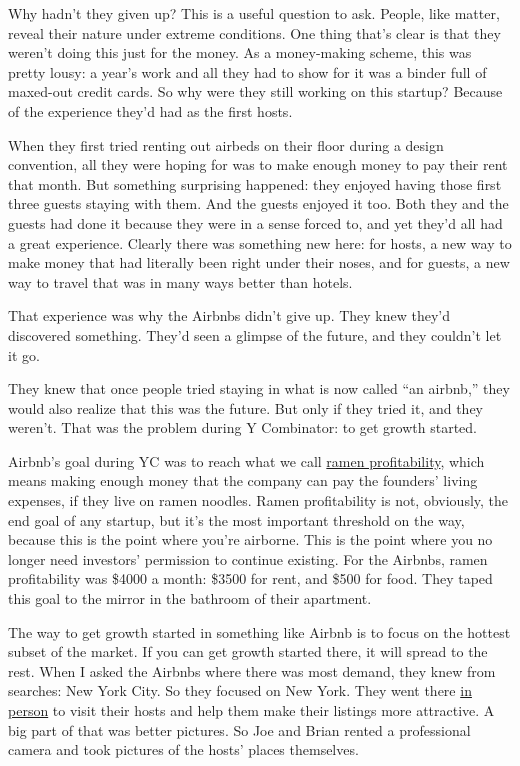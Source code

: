 Why hadn't they given up? This is a useful question to ask. People, like
matter, reveal their nature under extreme conditions. One thing that's
clear is that they weren't doing this just for the money. As a
money-making scheme, this was pretty lousy: a year's work and all they
had to show for it was a binder full of maxed-out credit cards. So why
were they still working on this startup? Because of the experience
they'd had as the first hosts.

When they first tried renting out airbeds on their floor during a design
convention, all they were hoping for was to make enough money to pay
their rent that month. But something surprising happened: they enjoyed
having those first three guests staying with them. And the guests
enjoyed it too. Both they and the guests had done it because they were
in a sense forced to, and yet they'd all had a great experience. Clearly
there was something new here: for hosts, a new way to make money that
had literally been right under their noses, and for guests, a new way to
travel that was in many ways better than hotels.

That experience was why the Airbnbs didn't give up. They knew they'd
discovered something. They'd seen a glimpse of the future, and they
couldn't let it go.

They knew that once people tried staying in what is now called ``an
airbnb,'' they would also realize that this was the future. But only if
they tried it, and they weren't. That was the problem during Y
Combinator: to get growth started.

Airbnb's goal during YC was to reach what we call
\href{http://paulgraham.com/ramenprofitable.html}{ramen profitability},
which means making enough money that the company can pay the founders'
living expenses, if they live on ramen noodles. Ramen profitability is
not, obviously, the end goal of any startup, but it's the most important
threshold on the way, because this is the point where you're airborne.
This is the point where you no longer need investors' permission to
continue existing. For the Airbnbs, ramen profitability was \$4000 a
month: \$3500 for rent, and \$500 for food. They taped this goal to the
mirror in the bathroom of their apartment.

The way to get growth started in something like Airbnb is to focus on
the hottest subset of the market. If you can get growth started there,
it will spread to the rest. When I asked the Airbnbs where there was
most demand, they knew from searches: New York City. So they focused on
New York. They went there \href{http://paulgraham.com/ds.html}{in
person} to visit their hosts and help them make their listings more
attractive. A big part of that was better pictures. So Joe and Brian
rented a professional camera and took pictures of the hosts' places
themselves.

